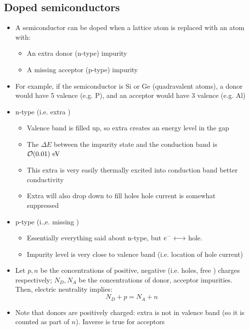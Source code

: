 \subsection{Doped semiconductors}
\begin{itemize}
  \item A semiconductor can be doped when a lattice atom is replaced with an atom with:
  \begin{itemize}
    \item An extra \el \thus donor (n-type) impurity
    \item A missing \el \thus acceptor (p-type) impurity
  \end{itemize}
  \item For example, if the semiconductor is Si or Ge (quadravalent atoms), a donor would have 5 valence \el (e.g. P), and an acceptor would have 3 valence \el (e.g. Al)
  \item n-type (i.e. extra \el)
  \begin{itemize}
    \item Valence band is filled up, so extra \el creates an energy level in the gap
    \item The $\Delta E$ between the impurity state and the conduction band is $\mathcal{O}(0.01)~\text{eV}$
    \item This extra \el is very easily thermally excited into conduction band \thus better conductivity
    \item Extra \el will also drop down to fill holes \thus hole current is somewhat suppressed
  \end{itemize}
  \item p-type (i.,e. missing \el)
  \begin{itemize}
    \item Essentially everything said about n-type, but $e^{-} \longleftrightarrow~$hole.
    \item Impurity level is very close to valence band (i.e. location of hole current)
  \end{itemize}
  \item Let $p,n$ be the concentrations of positive, negative (i.e. holes, free \el) charges respectively; $N_D,N_A$ be the concentrations of donor, acceptor impurities. Then, electric neutrality implies:
  \begin{equation}
    N_D+p = N_A+n
  \end{equation}
  \item Note that donors are positively charged: extra \el is not in valence band (so it is counted as part of $n$). Inverse is true for acceptors
\end{itemize}

